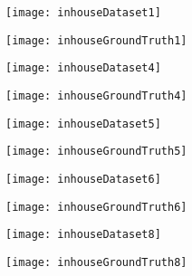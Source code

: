\begin{figure}[H]
  \begin{subfigure}[b]{0.72\textwidth}
    \centering
    \texttt{[image: inhouseDataset1]}
  \end{subfigure}%
  \hspace{0.3cm}
  \begin{subfigure}[b]{0.24\textwidth}
    \centering
    \texttt{[image: inhouseGroundTruth1]}
  \end{subfigure}
  \vspace{0.1cm}

  \begin{subfigure}[b]{0.72\textwidth}
    \centering
    \texttt{[image: inhouseDataset4]}
  \end{subfigure}%
  \hspace{0.3cm}
  \begin{subfigure}[b]{0.24\textwidth}
    \centering
    \texttt{[image: inhouseGroundTruth4]}
  \end{subfigure}
  \vspace{0.1cm}

  \begin{subfigure}[b]{0.72\textwidth}
    \centering
    \texttt{[image: inhouseDataset5]}
  \end{subfigure}%
  \hspace{0.3cm}
  \begin{subfigure}[b]{0.24\textwidth}
    \centering
    \texttt{[image: inhouseGroundTruth5]}
  \end{subfigure}
  \vspace{0.1cm}

  \begin{subfigure}[b]{0.72\textwidth}
    \centering
    \texttt{[image: inhouseDataset6]}
  \end{subfigure}%
  \hspace{0.3cm}
  \begin{subfigure}[b]{0.24\textwidth}
    \centering
    \texttt{[image: inhouseGroundTruth6]}
  \end{subfigure}
  \vspace{0.1cm}

  \begin{subfigure}[b]{0.72\textwidth}
    \centering
    \texttt{[image: inhouseDataset8]}
  \end{subfigure}%
  \hspace{0.3cm}
  \begin{subfigure}[b]{0.24\textwidth}
    \centering
    \texttt{[image: inhouseGroundTruth8]}
  \end{subfigure}
  \vspace{0.1cm}


\end{figure}
